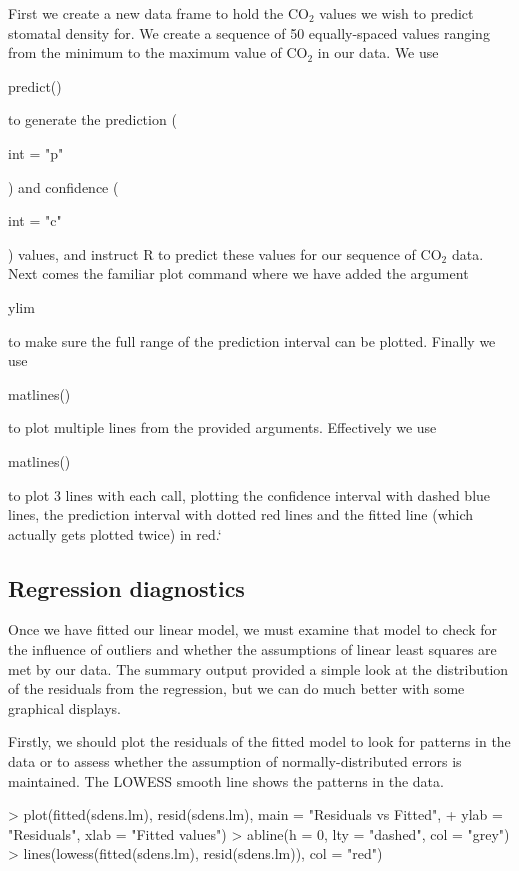 \documentclass[letterpaper,10pt]{article}
\newenvironment{rline}{\begin{small}\begin{ttfamily}}{\end{ttfamily}\end{small}}
\begin{document}
First we create a new data frame to hold the $\mathrm{CO}_2$ values we wish to predict stomatal density for. We create a sequence of 50 equally-spaced values ranging from the minimum to the maximum value of $\mathrm{CO}_2$ in our data. We use \begin{rline}predict()\end{rline} to generate the prediction (\begin{rline}int = "p"\end{rline}) and confidence (\begin{rline}int = "c"\end{rline}) values, and instruct R to predict these values for our sequence of $\mathrm{CO}_2$ data. Next comes the familiar plot command where we have added the argument \begin{rline}ylim\end{rline} to make sure the full range of the prediction interval can be plotted. Finally we use \begin{rline}matlines()\end{rline} to plot multiple lines from the provided arguments. Effectively we use \begin{rline}matlines()\end{rline} to plot 3 lines with each call, plotting the confidence interval with dashed blue lines, the prediction interval with dotted red lines and the fitted line (which actually gets plotted twice) in red.`

\subsection{Regression diagnostics}
Once we have fitted our linear model, we must examine that model to check for the influence of outliers and whether the assumptions of linear least squares are met by our data. The summary output provided a simple look at the distribution of the residuals from the regression, but we can do much better with some graphical displays.

Firstly, we should plot the residuals of the fitted model to look
for patterns in the data or to assess whether the assumption of normally-distributed errors is maintained. The LOWESS smooth line shows the  patterns in the data.

\begin{Schunk}
\begin{Sinput}
> plot(fitted(sdens.lm), resid(sdens.lm), main = "Residuals vs Fitted",
+      ylab = "Residuals", xlab = "Fitted values")
> abline(h = 0, lty = "dashed", col = "grey")
> lines(lowess(fitted(sdens.lm), resid(sdens.lm)), col = "red")
\end{Sinput}
\end{Schunk}
\end{document}
